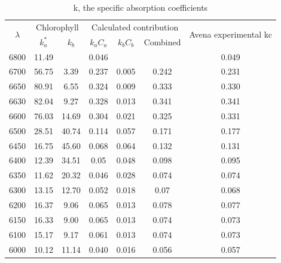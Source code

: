 \documentclass[a4paper, twocolumn, 11pt]{article}
\begin{document}
\begin{table}[htb]
	\begin{longtable}{|c|c|c|c|c|c|c|}
		\hline
		\multirow{2}{*}{$\lambda$} & 
		\multicolumn{2}{c}{Chlorophyll} \vline & 
		\multicolumn{3}{c}{Calculated contribution} \vline & 
		\multirow{2}{*}{Avena experimental kc} \\ \cline{2-6}
		& $k_a^*$ & $k_b$ & $k_aC_a$ & $k_bC_b$ & Combined & \\ \hline
		6800 & 11.49 & & 0.046 & & & 0.049 \\
		6700 & 56.75 & 3.39 & 0.237 & 0.005 & 0.242 & 0.231\\
		6650 & 80.91 & 6.55 & 0.324 & 0.009 & 0.333 & 0.330\\
		6630 & 82.04 & 9.27 & 0.328 & 0.013 & 0.341 & 0.341\\
		6600 & 76.03 & 14.69 & 0.304 & 0.021 & 0.325 & 0.331\\
		6500 & 28.51 & 40.74 & 0.114 & 0.057 & 0.171 &0.177\\
		6450 & 16.75 & 45.60 & 0.068 & 0.064 & 0.132 & 0.131\\
		6400 & 12.39 & 34.51 &0.05 & 0.048 & 0.098 & 0.095\\
		6350 & 11.62 & 20.32 & 0.046 & 0.028 & 0.074 & 0.074\\
		6300 & 13.15 & 12.70 & 0.052 & 0.018 & 0.07 &0.068\\
		6200 & 16.37 & 9.06 & 0.065 & 0.013 &0.078 & 0.077\\
		6150 & 16.33 &9.00 &0.065 & 0.013 & 0.074 & 0.073\\
		6100 & 15.17 & 9.17 & 0.061 & 0.013 & 0.074 & 0.073\\
		6000 & 10.12 & 11.14 & 0.040 & 0.016 & 0.056 & 0.057\\\hline
	\end{longtable}
	\caption{k, the specific absorption coefficients \cite{Mackinney}}
	\label{table1}
\end{table}
\end{document}
